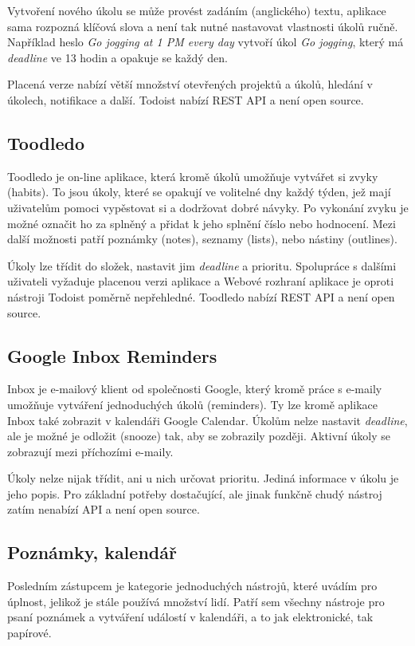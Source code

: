 \documentclass[thesis=B,czech]{FITthesis}[2012/06/26]
\begin{document}
			Vytvoření nového úkolu se může provést zadáním (anglického) textu, aplikace sama rozpozná klíčová slova a není tak nutné nastavovat vlastnosti úkolů ručně. Například heslo \textit{Go jogging at 1 PM every day} vytvoří úkol \textit{Go jogging}, který má \textit{deadline} ve 13 hodin a opakuje se každý den. 
			
			Placená verze nabízí větší množství otevřených projektů a úkolů, hledání v úkolech, notifikace a další.\cite{todoist-compare-premium} Todoist nabízí REST API\cite{todoist-api} a není open source.
			
		\subsection{Toodledo}
			Toodledo \cite{toodledo} je on-line aplikace, která kromě úkolů umožňuje vytvářet si zvyky (habits). To jsou úkoly, které se opakují ve volitelné dny každý týden, jež mají uživatelům pomoci vypěstovat si a dodržovat dobré návyky. Po vykonání zvyku je možné označit ho za splněný a přidat k jeho splnění číslo nebo hodnocení. Mezi další možnosti patří poznámky (notes), seznamy (lists), nebo nástiny (outlines). 
			
			Úkoly lze třídit do složek, nastavit jim \textit{deadline} a prioritu. Spolupráce s dalšími uživateli vyžaduje placenou verzi aplikace a Webové rozhraní aplikace je oproti nástroji Todoist poměrně nepřehledné. Toodledo nabízí REST API\cite{toodledo-api} a není open source.
			
		\subsection{Google Inbox Reminders}
			Inbox \cite{ginbox} je e-mailový klient od společnosti Google, který kromě práce s e-maily umožňuje vytváření jednoduchých úkolů (reminders). Ty lze kromě aplikace Inbox také zobrazit v kalendáři Google Calendar.\cite{gcal} Úkolům nelze nastavit \textit{deadline}, ale je možné je odložit (snooze) tak, aby se zobrazily později. Aktivní úkoly se zobrazují mezi příchozími e-maily.
			
			Úkoly nelze nijak třídit, ani u nich určovat prioritu. Jediná informace v úkolu je jeho popis. Pro základní potřeby dostačující, ale jinak funkčně chudý nástroj zatím nenabízí API\cite{ginbox-no-api} a není open source.
			
			
			
		\subsection{Poznámky, kalendář}
			Posledním zástupcem je kategorie jednoduchých nástrojů, které uvádím pro úplnost, jelikož je stále používá množství lidí. Patří sem všechny nástroje pro psaní poznámek a vytváření událostí v kalendáři, a to jak elektronické, tak papírové. 
			
\end{document}
